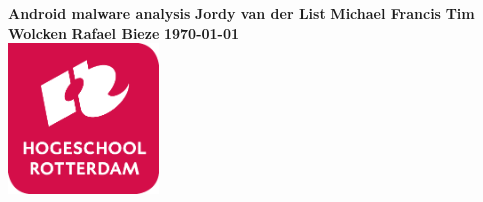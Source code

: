 \documentclass{article}
\begin{document}


\begin{titlepage}
  \centering
    \vfill
    {\bfseries\Huge
      Android malware analysis
        \vskip2cm
      }
      {\bfseries\Large
        Jordy van der List
        \vskip0cm
      }
      {\bfseries\Large
        Michael Francis
        \vskip0cm
      }
      {\bfseries\Large
        Tim Wolcken
        \vskip0cm
      }
      {\bfseries\Large
        Rafael Bieze
        \vskip0cm
      }
      {
        \bfseries\normalsize
        \vskip1cm
        \today\\
    }
    \vfill
    \includegraphics[width=4cm]{logohr.png} %
    \vfill
    \vfill
\end{titlepage}

\setlength{\parindent}{0em}
\setlength{\parskip}{1em}
\flushleft



\setlength{\parindent}{1em}
\setlength{\parskip}{0em}
\flushleft

\newpage
\tableofcontents

\setlength{\parindent}{0em}
\setlength{\parskip}{1em}
\flushleft

\newpage


\newpage


\newpage


\newpage


\newpage


\newpage


\newpage






\end{document}
